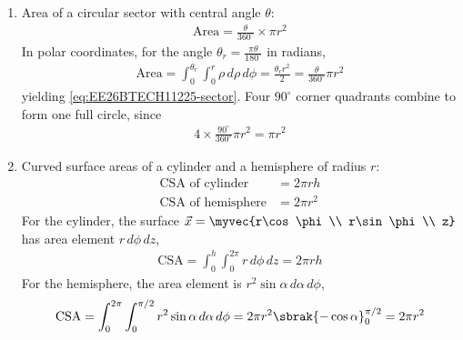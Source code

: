 \begin{enumerate}[label=\thesubsection.\arabic*, ref=\thesubsection.\theenumi]
\item Area of a circular sector with central angle $\theta$:
\begin{align}
	\text{Area} = \frac{\theta}{360^\circ} \times \pi r^2
	\label{eq:EE26BTECH11225-sector}
\end{align}
\solution
In polar coordinates, for the angle $\theta_r = \frac{\pi\theta}{180^\circ}$ in radians,
\begin{align}
	\text{Area} = \int_{0}^{\theta_r}\int_{0}^{r}\rho\,d\rho\,d\phi
	= \frac{\theta_r r^2}{2} = \frac{\theta}{360^\circ}\pi r^2
\end{align}
yielding \eqref{eq:EE26BTECH11225-sector}. Four $90^\circ$ corner quadrants combine to form one full circle, since
\begin{align}
	4 \times \frac{90^\circ}{360^\circ}\pi r^2 = \pi r^2
\end{align}

\item Curved surface areas of a cylinder and a hemisphere of radius $r$:
\begin{align}
	\text{CSA of cylinder} &= 2\pi rh
	\label{eq:EE26BTECH11225-csa-cyl}
	\\
	\text{CSA of hemisphere} &= 2\pi r^2
	\label{eq:EE26BTECH11225-csa-hemi}
\end{align}
\solution
For the cylinder, the surface $\vec{x} = \myvec{r\cos\phi \\ r\sin\phi \\ z}$ has area element $r\,d\phi\,dz$,
\begin{align}
	\text{CSA} = \int_{0}^{h}\int_{0}^{2\pi} r\,d\phi\,dz = 2\pi rh
\end{align}
For the hemisphere, the area element is $r^2\sin\alpha\,d\alpha\,d\phi$,
\begin{align}
	\text{CSA} = \int_{0}^{2\pi}\int_{0}^{\pi/2} r^2\sin\alpha\,d\alpha\,d\phi
	= 2\pi r^2\sbrak{-\cos\alpha}_{0}^{\pi/2} = 2\pi r^2
\end{align}


\end{enumerate}
